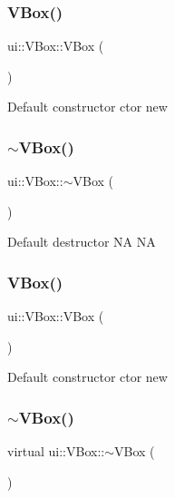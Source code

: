 \subsubsection{\texorpdfstring{V\+Box()}{VBox()}\hspace{0.1cm}{\footnotesize\ttfamily [1/2]}}
{\footnotesize\ttfamily ui\+::\+V\+Box\+::\+V\+Box (\begin{DoxyParamCaption}{ }\end{DoxyParamCaption})}

Default constructor  ctor  new \mbox{\label{classui_1_1VBox_a8717e2ea242504ad7a2b2a15c6fc11ce}} 
\subsubsection{\texorpdfstring{$\sim$\+V\+Box()}{~VBox()}\hspace{0.1cm}{\footnotesize\ttfamily [1/2]}}
{\footnotesize\ttfamily ui\+::\+V\+Box\+::$\sim$\+V\+Box (\begin{DoxyParamCaption}{ }\end{DoxyParamCaption})\hspace{0.3cm}{\ttfamily [virtual]}}

Default destructor  NA  NA \mbox{\label{classui_1_1VBox_a7aadb18ab5624f959f0ee49be744393f}} 
\subsubsection{\texorpdfstring{V\+Box()}{VBox()}\hspace{0.1cm}{\footnotesize\ttfamily [2/2]}}
{\footnotesize\ttfamily ui\+::\+V\+Box\+::\+V\+Box (\begin{DoxyParamCaption}{ }\end{DoxyParamCaption})}

Default constructor  ctor  new \mbox{\label{classui_1_1VBox_ad8be1428759c3fb3b4d1d2def853b935}} 
\subsubsection{\texorpdfstring{$\sim$\+V\+Box()}{~VBox()}\hspace{0.1cm}{\footnotesize\ttfamily [2/2]}}
{\footnotesize\ttfamily virtual ui\+::\+V\+Box\+::$\sim$\+V\+Box (\begin{DoxyParamCaption}{ }\end{DoxyParamCaption})\hspace{0.3cm}{\ttfamily [virtual]}}

